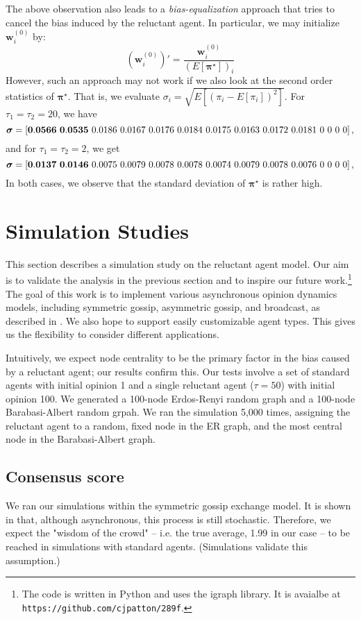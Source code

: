 \documentclass[letter]{article}
\theoremstyle{remark}
\begin{document}
The above observation also leads to a \emph{bias-equalization} approach that tries to cancel the bias induced by the reluctant agent. In particular, we may initialize ${\bm w}_i^{(0)}$ by:
\[
({\bm w}_i^{(0)})' = \frac{{\bm w}_i^{(0)}}{ (E[\bm{\pi}^\star])_i }
\]
However, such an approach may not work if we also look at the second order statistics of $\bm{\pi}^\star$. That is, we evaluate $\sigma_i = \sqrt{E[ (\pi_i - E[\pi_i])^2 ]}$. For $\tau_1 = \tau_2 = 20$, we have
\[
\bm{\sigma} = \left[  {\bf 0.0566~0.0535} ~0.0186~0.0167~0.0176~0.0184~0.0175~0.0163~0.0172~0.0181~0~0~0~0 \right],
\]
and for $\tau_1 = \tau_2 = 2$, we get
\[
\bm{\sigma} = \left[  {\bf 0.0137~0.0146} ~0.0075~0.0079~0.0078~0.0078~0.0074~0.0079~0.0078~0.0076~0~0~0~0 \right],
\]
In both cases, we observe that the standard deviation of $\bm{\pi}^\star$ is rather high. 


\section{Simulation Studies}
This section describes a simulation study on the reluctant agent model. Our aim is to validate the analysis in the previous section and to inspire our future work.\footnote{The code is written in Python and uses the igraph library. It is avaialbe at \texttt{https://github.com/cjpatton/289f}.}
The goal of this work is to implement various asynchronous opinion dynamics models, including symmetric gossip, asymmetric gossip, and broadcast, as described in \cite{Fagnani2014}. We also hope to support easily customizable agent types. This gives us the flexibility to consider different applications. 

Intuitively, we expect node centrality to be the primary factor in the bias caused by a reluctant agent; our results confirm this. Our tests involve a set of standard agents with initial opinion 1 and a single reluctant agent ($\tau = 50$) with initial opinion 100. We generated a 100-node Erdos-Renyi random graph and a 100-node Barabasi-Albert random grpah. We ran the simulation 5,000 times, assigning the reluctant agent to a random, fixed node in the ER graph, and the most central node in the Barabasi-Albert graph. 

\subsection{Consensus score}
We ran our simulations within the symmetric gossip exchange model. It is shown in \cite{Fagnani2014} that, although asynchronous, this process is still stochastic. Therefore, we expect the "wisdom of the crowd" -- i.e. the true average, 1.99 in our case -- to be reached in simulations with standard agents. (Simulations validate this assumption.)
\end{document}
